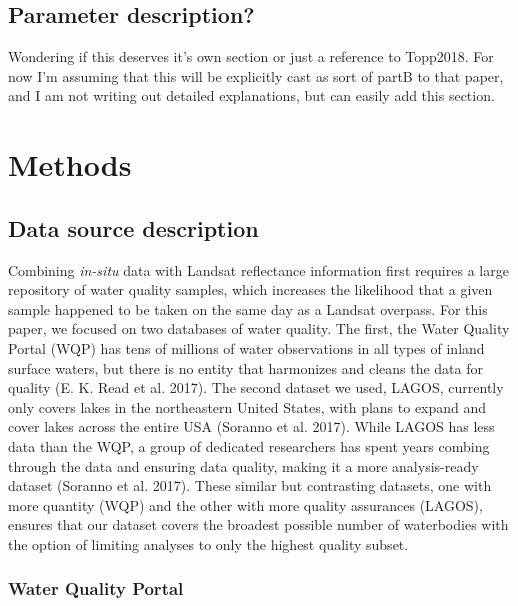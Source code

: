 \documentclass[]{article}
\begin{document}
\subsection{Parameter description?}\label{parameter-description}

Wondering if this deserves it's own section or just a reference to
Topp2018. For now I'm assuming that this will be explicitly cast as sort
of partB to that paper, and I am not writing out detailed explanations,
but can easily add this section.

\section{Methods}\label{methods}

\subsection{Data source description}\label{data-source-description}

Combining \emph{in-situ} data with Landsat reflectance information first
requires a large repository of water quality samples, which increases
the likelihood that a given sample happened to be taken on the same day
as a Landsat overpass. For this paper, we focused on two databases of
water quality. The first, the Water Quality Portal (WQP) has tens of
millions of water observations in all types of inland surface waters,
but there is no entity that harmonizes and cleans the data for quality
(E. K. Read et al. 2017). The second dataset we used, LAGOS, currently
only covers lakes in the northeastern United States, with plans to
expand and cover lakes across the entire USA (Soranno et al. 2017).
While LAGOS has less data than the WQP, a group of dedicated researchers
has spent years combing through the data and ensuring data quality,
making it a more analysis-ready dataset (Soranno et al. 2017). These
similar but contrasting datasets, one with more quantity (WQP) and the
other with more quality assurances (LAGOS), ensures that our dataset
covers the broadest possible number of waterbodies with the option of
limiting analyses to only the highest quality subset.

\subsubsection{Water Quality Portal}\label{water-quality-portal}
\end{document}
